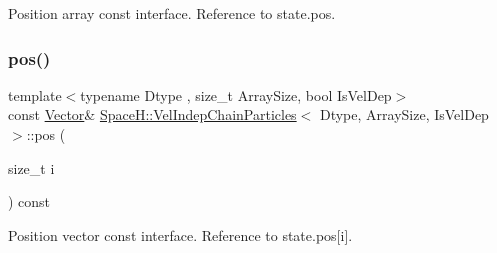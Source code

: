 Position array const interface. Reference to state.\+pos. 

\mbox{\label{class_space_h_1_1_vel_indep_chain_particles_a5cae7fea0fe56f87e1e1ca7da09fdeae}} 
\subsubsection{\texorpdfstring{pos()}{pos()}\hspace{0.1cm}{\footnotesize\ttfamily [2/2]}}
{\footnotesize\ttfamily template$<$typename Dtype , size\+\_\+t Array\+Size, bool Is\+Vel\+Dep$>$ \\
const \mbox{\hyperlink{class_space_h_1_1_vel_indep_particles_a61bbcfdb0dc7f99f3c68af69a755c935}{Vector}}\& \mbox{\hyperlink{class_space_h_1_1_vel_indep_chain_particles}{Space\+H\+::\+Vel\+Indep\+Chain\+Particles}}$<$ Dtype, Array\+Size, Is\+Vel\+Dep $>$\+::pos (\begin{DoxyParamCaption}\item[{size\+\_\+t}]{i }\end{DoxyParamCaption}) const\hspace{0.3cm}{\ttfamily [inline]}}



Position vector const interface. Reference to state.\+pos\mbox{[}i\mbox{]}. 

\mbox{\label{class_space_h_1_1_vel_indep_chain_particles_a60778581313c992696314625eb2b30cf}} 
